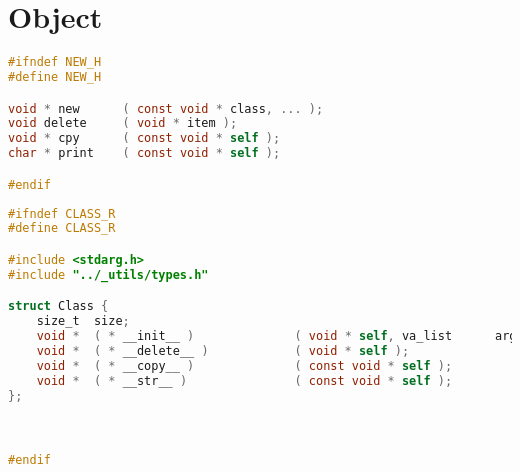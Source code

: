 \documentclass[fancychapters]{report}   	%
\begin{document}
\section{Object}
\begin{lstlisting}[language=C,caption={class.h}]
#ifndef NEW_H
#define NEW_H

void * new      ( const void * class, ... );
void delete     ( void * item );
void * cpy      ( const void * self );
char * print    ( const void * self );

#endif
\end{lstlisting}
\begin{lstlisting}[language=C,caption={class.r}]
#ifndef CLASS_R
#define CLASS_R

#include <stdarg.h>
#include "../_utils/types.h"

struct Class {
    size_t  size;
    void *  ( * __init__ )              ( void * self, va_list      args );
    void *  ( * __delete__ )            ( void * self );
    void *  ( * __copy__ )              ( const void * self );
    void *  ( * __str__ )               ( const void * self );
};



#endif
\end{lstlisting}
\end{document}
